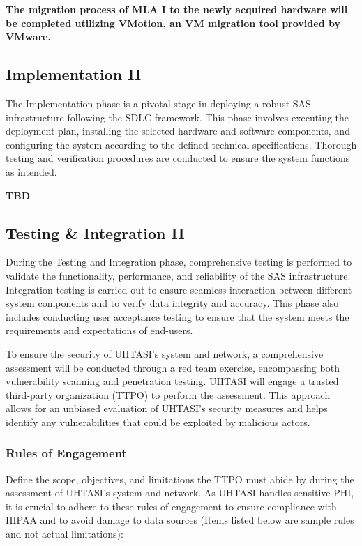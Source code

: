 \textbf{The migration process of MLA I to the newly acquired hardware will be completed utilizing VMotion, an VM migration tool provided by VMware.}

\subsection{Implementation II}
The Implementation phase is a pivotal stage in deploying a robust SAS infrastructure following the SDLC framework. This phase involves executing the deployment plan, installing the selected hardware and software components, and configuring the system according to the defined technical specifications. Thorough testing and verification procedures are conducted to ensure the system functions as intended.

\textbf{TBD}

\subsection{Testing \& Integration II}
During the Testing and Integration phase, comprehensive testing is performed to validate the functionality, performance, and reliability of the SAS infrastructure. Integration testing is carried out to ensure seamless interaction between different system components and to verify data integrity and accuracy. This phase also includes conducting user acceptance testing to ensure that the system meets the requirements and expectations of end-users.

To ensure the security of UHTASI's system and network, a comprehensive assessment will be conducted through a red team exercise, encompassing both vulnerability scanning and penetration testing. UHTASI will engage a trusted third-party organization (TTPO) to perform the assessment. This approach allows for an unbiased evaluation of UHTASI's security measures and helps identify any vulnerabilities that could be exploited by malicious actors.

\subsubsection{Rules of Engagement}
Define the scope, objectives, and limitations the TTPO must abide by during the assessment of UHTASI's system and network. As UHTASI handles sensitive PHI, it is crucial to adhere to these rules of engagement to ensure compliance with HIPAA and to avoid damage to data sources (Items listed below are sample rules and not actual limitations):

